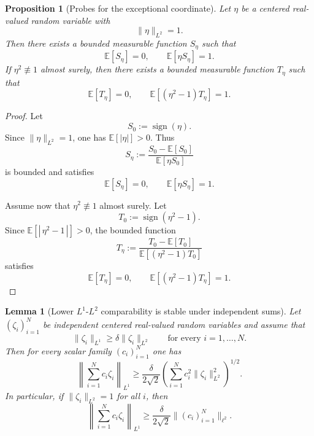 \documentclass[11pt]{amsart}
\newtheorem{proposition}[theorem]{Proposition}
\newtheorem{lemma}[theorem]{Lemma}
\newcommand{\E}{\mathbb E}
\begin{document}
\begin{proposition}[Probes for the exceptional coordinate]
\label{prop:exceptional-probes}
Let $\eta$ be a centered real-valued random variable with
\[
\|\eta\|_{L^2}=1.
\]
Then there exists a bounded measurable function $S_\eta$ such that
\[
\E[S_\eta]=0,
\qquad
\E[\eta S_\eta]=1.
\]
If $\eta^2 \not\equiv 1$ almost surely, then there exists a bounded measurable
function $T_\eta$ such that
\[
\E[T_\eta]=0,
\qquad
\E[(\eta^2-1)T_\eta]=1.
\]
\end{proposition}

\begin{proof}
Let
\[
S_0 := \operatorname{sign}(\eta).
\]
Since $\|\eta\|_{L^2}=1$, one has $\E[|\eta|]>0$. Thus
\[
S_\eta := \frac{S_0-\E[S_0]}{\E[\eta S_0]}
\]
is bounded and satisfies
\[
\E[S_\eta]=0,
\qquad
\E[\eta S_\eta]=1.
\]

Assume now that $\eta^2 \not\equiv 1$ almost surely. Let
\[
T_0 := \operatorname{sign}(\eta^2-1).
\]
Since $\E[|\,\eta^2-1\,|]>0$, the bounded function
\[
T_\eta := \frac{T_0-\E[T_0]}{\E[(\eta^2-1)T_0]}
\]
satisfies
\[
\E[T_\eta]=0,
\qquad
\E[(\eta^2-1)T_\eta]=1.
\]
\end{proof}

\begin{lemma}[Lower $L^1$-$L^2$ comparability is stable under independent sums]
\label{lem:l1l2-linear-combinations}
Let $(\zeta_i)_{i=1}^N$ be independent centered real-valued random variables and
assume that
\[
\|\zeta_i\|_{L^1} \ge \delta \|\zeta_i\|_{L^2}
\qquad
\text{for every } i=1,\dots,N.
\]
Then for every scalar family $(c_i)_{i=1}^N$ one has
\[
\left\|\sum_{i=1}^N c_i \zeta_i \right\|_{L^1}
\ge
\frac{\delta}{2\sqrt 2}
\left(\sum_{i=1}^N c_i^2 \|\zeta_i\|_{L^2}^2 \right)^{1/2}.
\]
In particular, if $\|\zeta_i\|_{L^2}=1$ for all $i$, then
\[
\left\|\sum_{i=1}^N c_i \zeta_i \right\|_{L^1}
\ge
\frac{\delta}{2\sqrt 2}\|(c_i)_{i=1}^N\|_{\ell^2}.
\]
\end{lemma}
\end{document}
